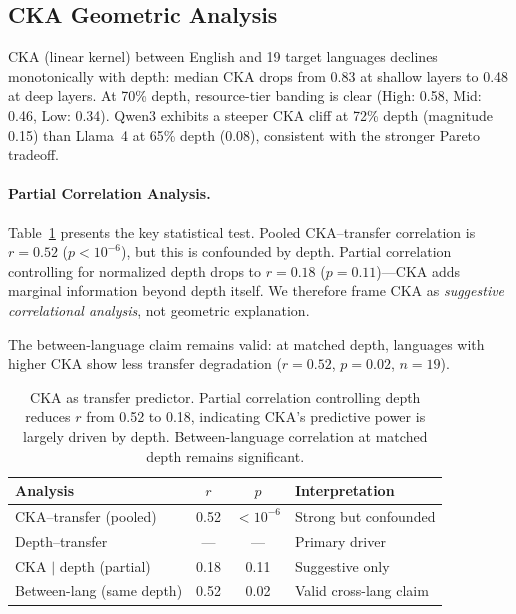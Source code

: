 \documentclass[11pt,a4paper]{article}
\begin{document}
\subsection{CKA Geometric Analysis}
\label{sec:cka}

CKA (linear kernel) between English and 19 target languages declines monotonically with depth: median CKA drops from 0.83 at shallow layers to 0.48 at deep layers.
At 70\% depth, resource-tier banding is clear (High: 0.58, Mid: 0.46, Low: 0.34).
Qwen3 exhibits a steeper CKA cliff at 72\% depth (magnitude 0.15) than Llama~4 at 65\% depth (0.08), consistent with the stronger Pareto tradeoff.

\paragraph{Partial Correlation Analysis.}
Table~\ref{tab:cka_partial} presents the key statistical test.
Pooled CKA--transfer correlation is $r = 0.52$ ($p < 10^{-6}$), but this is confounded by depth.
Partial correlation controlling for normalized depth drops to $r = 0.18$ ($p = 0.11$)---CKA adds marginal information beyond depth itself.
We therefore frame CKA as \emph{suggestive correlational analysis}, not geometric explanation.

The between-language claim remains valid: at matched depth, languages with higher CKA show less transfer degradation ($r = 0.52$, $p = 0.02$, $n = 19$).

\begin{table}[t]
\centering
\small
\begin{tabular}{lccl}
\toprule
\textbf{Analysis} & $r$ & $p$ & \textbf{Interpretation} \\
\midrule
CKA--transfer (pooled) & 0.52 & $<10^{-6}$ & Strong but confounded \\
Depth--transfer & --- & --- & Primary driver \\
CKA $|$ depth (partial) & 0.18 & 0.11 & Suggestive only \\
\midrule
Between-lang (same depth) & 0.52 & 0.02 & Valid cross-lang claim \\
\bottomrule
\end{tabular}
\caption{CKA as transfer predictor. Partial correlation controlling depth reduces $r$ from 0.52 to 0.18, indicating CKA's predictive power is largely driven by depth. Between-language correlation at matched depth remains significant.}
\label{tab:cka_partial}
\end{table}
\end{document}
